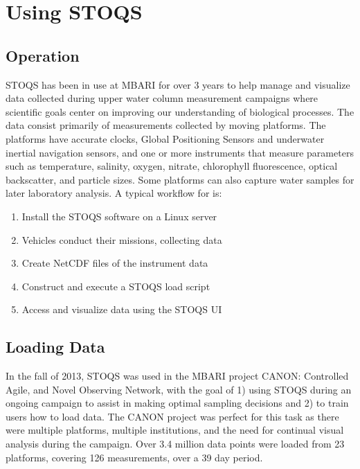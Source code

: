 \section{Using STOQS}

\subsection{Operation}

STOQS has been in use at MBARI for over 3 years to help manage and visualize data collected during upper water column measurement campaigns where scientific goals center on improving our understanding of biological processes. The data consist primarily of measurements collected by moving platforms. The platforms have accurate clocks, Global Positioning Sensors and underwater inertial navigation sensors, and one or more instruments that measure parameters such as temperature, salinity, oxygen, nitrate, chlorophyll fluorescence, optical backscatter, and particle sizes. Some platforms can also capture water samples for later laboratory analysis. A typical workflow for is:
\begin{enumerate}
\item Install the STOQS software on a Linux server
\item Vehicles conduct their missions, collecting data
\item Create NetCDF files of the instrument data
\item Construct and execute a STOQS load script
\item Access and visualize data using the STOQS UI
\end{enumerate}


\subsection{Loading Data}

In the fall of 2013, STOQS was used in the MBARI project CANON: Controlled Agile, and Novel Observing Network, with the goal of 1) using STOQS during an ongoing campaign to assist in making optimal sampling decisions and 2) to train users how to load data.  The CANON project was perfect for this task as there were multiple platforms, multiple institutions, and the need for continual visual analysis during the campaign.  Over 3.4 million data points were loaded from 23 platforms, covering 126 measurements, over a 39 day period. 

